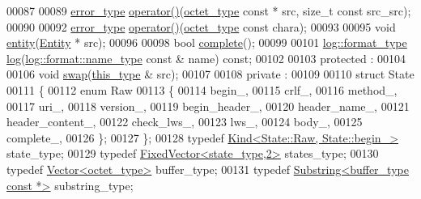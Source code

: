 \begin{DoxyCode}
00087 
00089     \hyperlink{classhryky_1_1error_1_1_holder}{error_type} \hyperlink{classhryky_1_1http_1_1request_1_1_reader_a9296b2ba874c791020f19cc7e422c61c}{operator()}(\hyperlink{namespacehryky_a488cba8b666be33ccca70e819684e3c8}{octet_type} \textcolor{keyword}{const} * src, \textcolor{keywordtype}{size\_t} \textcolor{keyword}{const} src\_src);
00090 
00092     \hyperlink{classhryky_1_1error_1_1_holder}{error_type} \hyperlink{classhryky_1_1http_1_1request_1_1_reader_a9296b2ba874c791020f19cc7e422c61c}{operator()}(\hyperlink{namespacehryky_a488cba8b666be33ccca70e819684e3c8}{octet_type} \textcolor{keyword}{const} chara);
00093 
00095     \textcolor{keywordtype}{void} \hyperlink{classhryky_1_1http_1_1request_1_1_reader_a533b30d861e82ddc5f1c2d5b282b38b4}{entity}(\hyperlink{classhryky_1_1http_1_1request_1_1_entity}{Entity} * src);
00096 
00098     \textcolor{keywordtype}{bool} \hyperlink{classhryky_1_1http_1_1request_1_1_reader_a30d9a067a3c54b9d949ecc7a22e8e2e1}{complete}();
00099 
00101     \hyperlink{classhryky_1_1_intrusive_ptr}{log::format_type} \hyperlink{classhryky_1_1http_1_1request_1_1_reader_a68e62284099638ec3942b10a52371d6c}{log}(\hyperlink{namespacehryky_1_1log_1_1format_ab7408d1e2ed2d648dbf9bba69eb74288}{log::format::name_type} \textcolor{keyword}{const} & name) \textcolor{keyword}{const};
00102 
00103 \textcolor{keyword}{protected} :
00104 
00106     \textcolor{keywordtype}{void} \hyperlink{classhryky_1_1http_1_1request_1_1_reader_afc16320249f2234208c6c5d5e2c80aac}{swap}(\hyperlink{classhryky_1_1http_1_1request_1_1_reader_a44528b6e5afc2cadb7f22b54f2ded317}{this_type} & src);
00107 
00108 \textcolor{keyword}{private} :
00109 
00110     \textcolor{keyword}{struct }State
00111     \{
00112         \textcolor{keyword}{enum} Raw
00113         \{
00114             begin\_,
00115             crlf\_,
00116             method\_,
00117             uri\_,
00118             version\_,
00119             begin\_header\_,
00120             header\_name\_,
00121             header\_content\_,
00122             check\_lws\_,
00123             lws\_,
00124             body\_,
00125             complete\_,
00126         \};
00127     \};
00128     \textcolor{keyword}{typedef} \hyperlink{classhryky_1_1_kind}{Kind<State::Raw, State::begin_>} state\_type;
00129     \textcolor{keyword}{typedef} \hyperlink{classhryky_1_1_fixed_vector}{FixedVector<state_type,2>}       states\_type;
00130     \textcolor{keyword}{typedef} \hyperlink{classhryky_1_1_vector}{Vector<octet_type>}              buffer\_type;
00131     \textcolor{keyword}{typedef} \hyperlink{classhryky_1_1_substring}{Substring<buffer_type const *>}  substring\_type;

\end{DoxyCode}

